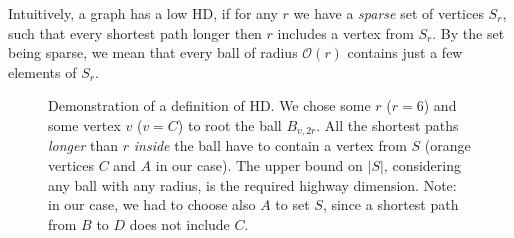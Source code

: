 	\noindent Intuitively, a graph has a low HD, if for any $r$ we have a \emph{sparse} set of vertices $S_{r}$, such that every shortest path longer then $r$ includes a vertex from $S_{r}$. By the set being sparse, we mean that every ball of radius $\mathcal{O}(r)$ contains just a few elements of $S_{r}$.

	\begin{figure}[h!]
    	\begin{center}
		\end{center}
        \caption{\label{fig:highdemonstr} Demonstration of a definition of HD. We chose some $r$ ($r = 6$) and some vertex $v$ ($v = C$) to root the ball $B_{v, 2r}$. All the shortest paths \emph{longer} than $r$ \emph{inside} the ball have to contain a vertex from $S$ (orange vertices $C$ and $A$ in our case). The upper bound on $|S|$, considering any ball with any radius, is the required highway dimension. Note: in our case, we had to choose also $A$ to set $S$, since a shortest path from $B$ to $D$ does not include $C$.}
	\end{figure}
	